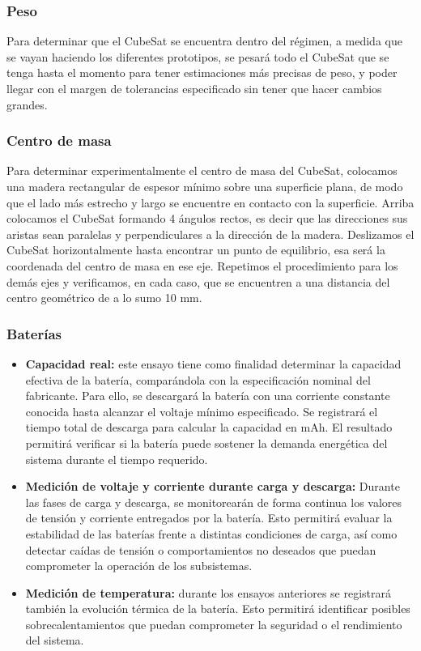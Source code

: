     \subsubsection{Peso}
      Para determinar que el CubeSat se encuentra dentro del régimen, a medida que se vayan haciendo los diferentes
      prototipos, se pesará todo el CubeSat que se tenga hasta el momento para tener estimaciones más precisas de peso, y
      poder llegar con el margen de tolerancias especificado sin tener que hacer cambios grandes.

    \subsubsection{Centro de masa}
      Para determinar experimentalmente el centro de masa del CubeSat, colocamos una madera rectangular de espesor
      mínimo sobre una superficie plana, de modo que el lado más estrecho y largo se encuentre en contacto con la
      superficie. Arriba colocamos el CubeSat formando 4 ángulos rectos, es decir que las direcciones sus aristas sean
      paralelas y perpendiculares a la dirección de la madera. Deslizamos el CubeSat horizontalmente hasta encontrar un
      punto de equilibrio, esa será la coordenada del centro de masa en ese eje. Repetimos el procedimiento para los
      demás ejes y verificamos, en cada caso, que se encuentren a una distancia del centro geométrico de a lo sumo 10
      mm.

    \subsubsection{Baterías}
      \begin{itemize}
        \item \textbf{Capacidad real:} este ensayo tiene como finalidad determinar la capacidad efectiva de la batería,
          comparándola con la especificación nominal del fabricante. Para ello, se descargará la batería con una
          corriente constante conocida hasta alcanzar el voltaje mínimo especificado. Se registrará el tiempo total de
          descarga para calcular la capacidad en mAh.  El resultado permitirá verificar si la batería puede sostener la
          demanda energética del sistema durante el tiempo requerido.

        \item \textbf{Medición de voltaje y corriente durante carga y descarga:} Durante las fases de carga y descarga,
          se monitorearán de forma continua los valores de tensión y corriente entregados por la batería. Esto permitirá
          evaluar la estabilidad de las baterías frente a distintas condiciones de carga, así como detectar caídas de tensión
          o comportamientos no deseados que puedan comprometer la operación de los subsistemas.

        \item \textbf{Medición de temperatura:} durante los ensayos anteriores se registrará también la evolución
          térmica de la batería. Esto permitirá identificar posibles sobrecalentamientos que puedan comprometer la
          seguridad o el rendimiento del sistema.
      \end{itemize}

